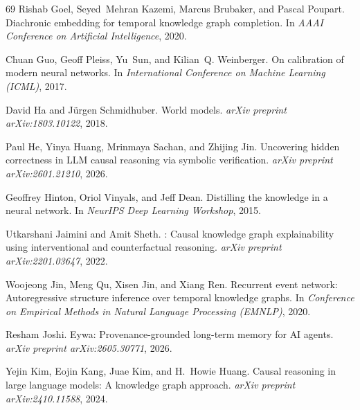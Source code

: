 \documentclass[11pt]{article}
\theoremstyle{plain}
\begin{document}
{\begin{thebibliography}{69}
Rishab Goel, Seyed~Mehran Kazemi, Marcus Brubaker, and Pascal Poupart.
\newblock Diachronic embedding for temporal knowledge graph completion.
\newblock In \emph{AAAI Conference on Artificial Intelligence}, 2020.

Chuan Guo, Geoff Pleiss, Yu~Sun, and Kilian~Q. Weinberger.
\newblock On calibration of modern neural networks.
\newblock In \emph{International Conference on Machine Learning (ICML)}, 2017.

David Ha and J{\"u}rgen Schmidhuber.
\newblock World models.
\newblock \emph{arXiv preprint arXiv:1803.10122}, 2018.

Paul He, Yinya Huang, Mrinmaya Sachan, and Zhijing Jin.
\newblock Uncovering hidden correctness in {LLM} causal reasoning via symbolic
  verification.
\newblock \emph{arXiv preprint arXiv:2601.21210}, 2026.

Geoffrey Hinton, Oriol Vinyals, and Jeff Dean.
\newblock Distilling the knowledge in a neural network.
\newblock In \emph{NeurIPS Deep Learning Workshop}, 2015.

Utkarshani Jaimini and Amit Sheth.
: Causal knowledge graph explainability using
  interventional and counterfactual reasoning.
\newblock \emph{arXiv preprint arXiv:2201.03647}, 2022.

Woojeong Jin, Meng Qu, Xisen Jin, and Xiang Ren.
\newblock Recurrent event network: Autoregressive structure inference over
  temporal knowledge graphs.
\newblock In \emph{Conference on Empirical Methods in Natural Language
  Processing (EMNLP)}, 2020.

Resham Joshi.
\newblock Eywa: Provenance-grounded long-term memory for {AI} agents.
\newblock \emph{arXiv preprint arXiv:2605.30771}, 2026.

Yejin Kim, Eojin Kang, Juae Kim, and H.~Howie Huang.
\newblock Causal reasoning in large language models: A knowledge graph
  approach.
\newblock \emph{arXiv preprint arXiv:2410.11588}, 2024.


\end{thebibliography}}
\end{document}
